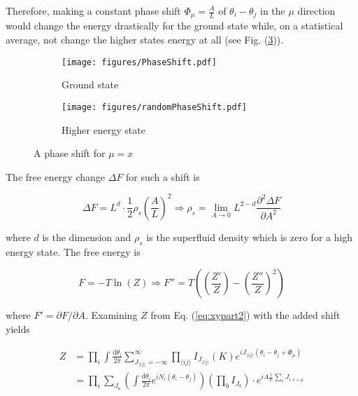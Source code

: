 Therefore, making a constant phase shift $\Phi_\mu = \frac{A}{L}$ of $\theta_i - \theta_j$ in the $\mu$ direction would change the energy drastically for the ground state while, on a statistical average, not change the higher states energy at all (see Fig. (\ref{fig:xyphaseshift})).

\begin{figure}[h!]
\centering
    \begin{subfigure}{.4\textwidth}
        \centering
        \texttt{[image: figures/PhaseShift.pdf]}
        \caption{Ground state}
        \label{fig:xyground}
    \end{subfigure}
    \begin{subfigure}{.4\textwidth}
        \centering
        \texttt{[image: figures/randomPhaseShift.pdf]}
        \caption{Higher energy state}
        \label{fig:xyhigher}
    \end{subfigure}
    \caption{A phase shift for $\mu = x$}
\label{fig:xyphaseshift}
\end{figure}

The free energy change $\Delta F$ for such a shift is

\begin{equation}
    \Delta F = L^d \cdot \frac{1}{2} \rho_s \left( \frac{A}{L} \right)^2 \Rightarrow \rho_s = \lim_{A \to 0} L^{2 - d}\frac{\partial^2 \Delta F}{\partial A^2}
\end{equation}

\noindent where $d$ is the dimension and $\rho_s$ is the superfluid density which is zero for a high energy state. The free energy is

\begin{equation}
F = - T \ln(Z) \Rightarrow F'' = T \left(\left(\frac{Z'}{Z}\right) - \left( \frac{Z''}{Z} \right)^2 \right)
\label{eq:xyfreeenergy}
\end{equation}

\noindent where $F' = \partial F / \partial A$. Examining $Z$ from Eq. (\ref{eq:xypart2}) with the added shift yields

\begin{align}
    Z &= \prod_i \int \frac{\mathrm d \theta_i}{2 \pi} \sum_{J_{\langle ij \rangle} = -\infty}^{\infty} \prod_{\langle ij \rangle} I_{J_{\langle ij \rangle}} ( K ) e^{i J_{\langle ij \rangle} (\theta_i - \theta_j + \Phi_\mu)} \\
%
    & = \prod_i \sum_{J_b} \left ( \int \frac{\mathrm d \theta_i}{2 \pi} e^{i N_i (\theta_i - \theta_j)} \right ) \left ( \prod_b I_{J_b} \right ) \cdot e^{i A \frac{1}{L} \sum_i J_{i, i+\mu}} \\
\label{eq:xypart3}
\end{align}

